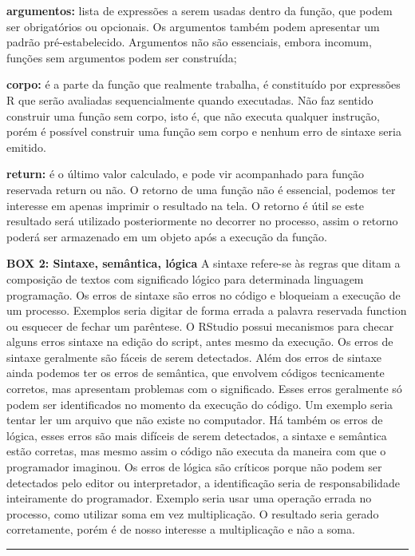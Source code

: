 \documentclass[
  11pt,
  a5paper,
  openany]{book}
\begin{document}
\textbf{argumentos:} lista de expressões a serem usadas dentro da função, que podem ser obrigatórios ou opcionais. Os argumentos também podem apresentar um padrão pré-estabelecido. Argumentos não são essenciais, embora incomum, funções sem argumentos podem ser construída;

\textbf{corpo:} é a parte da função que realmente trabalha, é constituído por expressões R que serão avaliadas sequencialmente quando executadas. Não faz sentido construir uma função sem corpo, isto é, que não executa qualquer instrução, porém é possível construir uma função sem corpo e nenhum erro de sintaxe seria emitido.

\textbf{return:} é o último valor calculado, e pode vir acompanhado para função reservada return ou não. O retorno de uma função não é essencial, podemos ter interesse em apenas imprimir o resultado na tela. O retorno é útil se este resultado será utilizado posteriormente no decorrer no processo, assim o retorno poderá ser armazenado em um objeto após a execução da função.

\textbf{BOX 2: Sintaxe, semântica, lógica}
A sintaxe refere-se às regras que ditam a composição de textos com significado lógico para determinada linguagem programação. Os erros de sintaxe são erros no código e bloqueiam a execução de um processo. Exemplos seria digitar de forma errada a palavra reservada function ou esquecer de fechar um parêntese. O RStudio possui mecanismos para checar alguns erros sintaxe na edição do script, antes mesmo da execução. Os erros de sintaxe geralmente são fáceis de serem detectados. Além dos erros de sintaxe ainda podemos ter os erros de semântica, que envolvem códigos tecnicamente corretos, mas apresentam problemas com o significado. Esses erros geralmente só podem ser identificados no momento da execução do código. Um exemplo seria tentar ler um arquivo que não existe no computador. Há também os erros de lógica, esses erros são mais difíceis de serem detectados, a sintaxe e semântica estão corretas, mas mesmo assim o código não executa da maneira com que o programador imaginou. Os erros de lógica são críticos porque não podem ser detectados pelo editor ou interpretador, a identificação seria de responsabilidade inteiramente do programador. Exemplo seria usar uma operação errada no processo, como utilizar soma em vez multiplicação. O resultado seria gerado corretamente, porém é de nosso interesse a multiplicação e não a soma.

\begin{center}\rule{0.5\linewidth}{0.5pt}\end{center}
\end{document}
